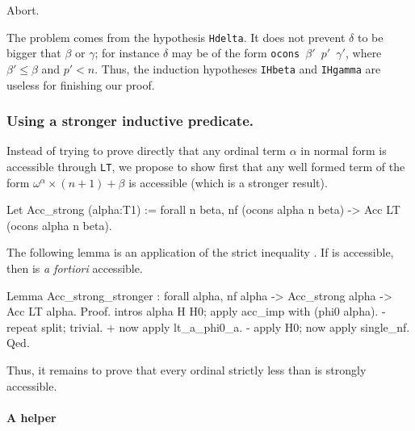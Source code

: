 \documentclass[a4paper]{book}
\begin{document}
\begin{Coqbad}
  Abort.
\end{Coqbad}

The problem comes from the hypothesis \texttt{Hdelta}. It does not prevent  \(\delta\) to be bigger that \(\beta\) or
\(\gamma\);
for instance \(\delta\) may be of the form
\texttt{ocons $\beta'$ $p'$  $\gamma'$},
where  \(\beta' \leq  \beta\) and  \(p' < n\).
Thus, the induction hypotheses \texttt{IHbeta} and \texttt{IHgamma}  are useless for finishing our proof.

\subsubsection{Using a stronger inductive predicate.}
\label{sec:orgheadline78}
  Instead of trying to prove directly that any ordinal term \(\alpha\) in normal form is accessible
through \texttt{LT}, we propose to show first that any well formed 
term of the form \(\omega^\alpha\times(n+1)+\beta\) is accessible (which is a stronger result).

\begin{Coqsrc}
 Let Acc_strong (alpha:T1) :=
      forall n beta, 
        nf (ocons alpha n beta) -> Acc LT (ocons alpha  n beta).
\end{Coqsrc}

The following lemma is an application of the strict inequality 
\showmath{\alpha < \omega ^\alpha}. If \showmath{\omega^\alpha} is accessible,
then \showmath{\alpha} is \emph{a fortiori} accessible.

\begin{Coqsrc}
 Lemma Acc_strong_stronger : forall alpha, 
     nf alpha -> Acc_strong  alpha -> Acc LT  alpha.
 Proof.
  intros alpha H H0; apply acc_imp with (phi0 alpha).
  - repeat split; trivial.
    + now apply lt_a_phi0_a.
  -  apply H0;  now apply single_nf.
Qed.
\end{Coqsrc}

Thus, it remains to prove that every ordinal strictly less than  
is strongly accessible.


\label{sec:orgheadline81}
\label{proof-wf-epsilon0}
\paragraph{A helper}
\label{sec:orgheadline79}
\end{document}
